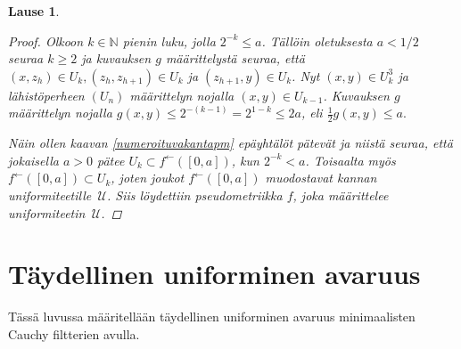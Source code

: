 \documentclass[12pt,a4paper,leqno]{report}
\newcommand{\N}{\mathbb{N}}
\newcommand{\U}{\,\mathcal{U}}
\theoremstyle{plain}
\newtheorem{lause}[equation]{Lause}
\newtheorem{kor}[equation]{Korollaari}
\theoremstyle{definition}
\theoremstyle{remark}
\begin{document}
\begin{lause}
\begin{proof}
Olkoon $k\in \N$ pienin luku, jolla $2^{-k}\leq a$. 
Tällöin oletuksesta $a<1/2$ seuraa $k\geq 2$ ja kuvauksen $g$ määrittelystä seuraa, että 
$(x,z_h)\in U_k,(z_h,z_{h+1})\in U_k$ ja $(z_{h+1},y)\in U_k$. 
Nyt 
$(x,y)\in U_k^3$ ja 
lähistöperheen $(U_n)$ määrittelyn nojalla $ (x,y)\in U_{k-1}$. 
Kuvauksen $g$ määrittelyn nojalla 
$g(x,y)\leq 2^{-(k-1)}=2^{1-k}\leq 2a$, eli $\frac{1}{2}g(x,y)\leq a.$ 

Näin ollen kaavan \ref{numeroituvakantapm} epäyhtälöt pätevät ja 
niistä seuraa, että jokaisella $a>0$ pätee 
$U_k\subset f^\leftarrow([0,a])$, kun $2^{-k}<a$. 
Toisaalta myös $f^\leftarrow([0,a])\subset U_k$, 
joten joukot $f^\leftarrow([0,a])$ muodostavat kannan uniformiteetille $\U$. 
Siis löydettiin pseudometriikka $f$, joka määrittelee uniformiteetin $\U$.
\end{proof}
\end{lause}
%
%
\chapter{Täydellinen uniforminen avaruus}
Tässä luvussa määritellään täydellinen uniforminen avaruus minimaalisten Cauchy filtterien avulla.
\end{document}
